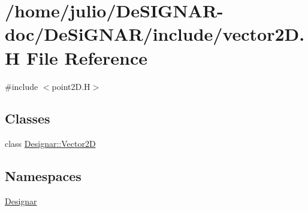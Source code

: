 \hypertarget{vector2_d_8_h}{}\section{/home/julio/\+De\+S\+I\+G\+N\+A\+R-\/doc/\+De\+Si\+G\+N\+A\+R/include/vector2D.H File Reference}
\label{vector2_d_8_h}
{\ttfamily \#include $<$point2\+D.\+H$>$}\newline
\subsection*{Classes}
\begin{DoxyCompactItemize}
\item 
class \hyperlink{class_designar_1_1_vector2_d}{Designar\+::\+Vector2D}
\end{DoxyCompactItemize}
\subsection*{Namespaces}
\begin{DoxyCompactItemize}
\item 
 \hyperlink{namespace_designar}{Designar}
\end{DoxyCompactItemize}
